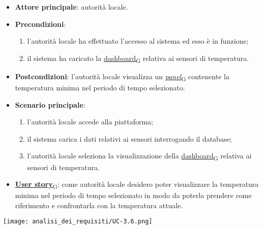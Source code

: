 \newpage

\begin{itemize}
	\item \textbf{Attore principale}: autorità locale.
	\item \textbf{Precondizioni}:
	      \begin{enumerate}
		      \item l'autorità locale ha effettuato l'accesso al sistema ed esso è in funzione;
		      \item il sistema ha caricato la \href{https://7last.github.io/docs/rtb/documentazione-interna/glossario\#dashboard}{dashboard\textsubscript{G}} relativa ai sensori di temperatura.
	      \end{enumerate}
	\item \textbf{Postcondizioni}: l'autorità locale visualizza un \href{https://7last.github.io/docs/rtb/documentazione-interna/glossario\#panel}{\textit{panel}\textsubscript{G}} contenente la temperatura minima nel periodo di tempo selezionato.
	\item \textbf{Scenario principale}:
	      \begin{enumerate}
		      \item l'autorità locale accede alla piattaforma;
		      \item il sistema carica i dati relativi ai sensori interrogando il database;
		      \item l'autorità locale seleziona la visualizzazione della \href{https://7last.github.io/docs/rtb/documentazione-interna/glossario\#dashboard}{dashboard\textsubscript{G}} relativa ai sensori di temperatura.
	      \end{enumerate}
	\item \href{https://7last.github.io/docs/rtb/documentazione-interna/glossario\#user-story}{\textbf{User story}\textsubscript{G}}:
	      come autorità locale desidero poter visualizzare la temperatura minima nel periodo di tempo selezionato
	      in modo da poterla prendere come riferimento e confrontarla con la temperatura attuale.
\end{itemize}
\begin{center}
	\texttt{[image: analisi\_dei\_requisiti/UC-3.6.png]}
\end{center}

